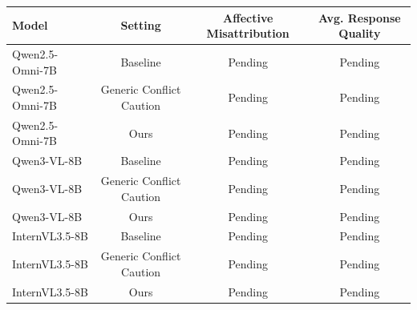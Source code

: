 \begin{tabular}{lccc}
\toprule
Model & Setting & Affective Misattribution & Avg. Response Quality \\
\midrule
Qwen2.5-Omni-7B & Baseline & Pending & Pending \\
Qwen2.5-Omni-7B & Generic Conflict Caution & Pending & Pending \\
Qwen2.5-Omni-7B & Ours & Pending & Pending \\
Qwen3-VL-8B & Baseline & Pending & Pending \\
Qwen3-VL-8B & Generic Conflict Caution & Pending & Pending \\
Qwen3-VL-8B & Ours & Pending & Pending \\
InternVL3.5-8B & Baseline & Pending & Pending \\
InternVL3.5-8B & Generic Conflict Caution & Pending & Pending \\
InternVL3.5-8B & Ours & Pending & Pending \\
\bottomrule
\end{tabular}
